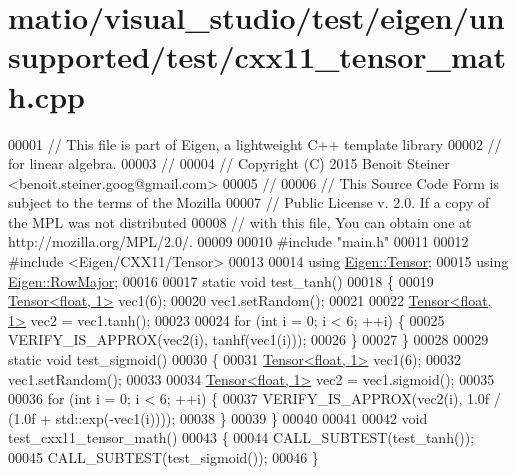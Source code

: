 \hypertarget{matio_2visual__studio_2test_2eigen_2unsupported_2test_2cxx11__tensor__math_8cpp_source}{}\section{matio/visual\+\_\+studio/test/eigen/unsupported/test/cxx11\+\_\+tensor\+\_\+math.cpp}
\label{matio_2visual__studio_2test_2eigen_2unsupported_2test_2cxx11__tensor__math_8cpp_source}

\begin{DoxyCode}
00001 \textcolor{comment}{// This file is part of Eigen, a lightweight C++ template library}
00002 \textcolor{comment}{// for linear algebra.}
00003 \textcolor{comment}{//}
00004 \textcolor{comment}{// Copyright (C) 2015 Benoit Steiner <benoit.steiner.goog@gmail.com>}
00005 \textcolor{comment}{//}
00006 \textcolor{comment}{// This Source Code Form is subject to the terms of the Mozilla}
00007 \textcolor{comment}{// Public License v. 2.0. If a copy of the MPL was not distributed}
00008 \textcolor{comment}{// with this file, You can obtain one at http://mozilla.org/MPL/2.0/.}
00009 
00010 \textcolor{preprocessor}{#include "main.h"}
00011 
00012 \textcolor{preprocessor}{#include <Eigen/CXX11/Tensor>}
00013 
00014 \textcolor{keyword}{using} \hyperlink{class_eigen_1_1_tensor}{Eigen::Tensor};
00015 \textcolor{keyword}{using} \hyperlink{group__enums_ggaacded1a18ae58b0f554751f6cdf9eb13acfcde9cd8677c5f7caf6bd603666aae3}{Eigen::RowMajor};
00016 
00017 \textcolor{keyword}{static} \textcolor{keywordtype}{void} test\_tanh()
00018 \{
00019   \hyperlink{class_eigen_1_1_tensor}{Tensor<float, 1>} vec1(6);
00020   vec1.setRandom();
00021 
00022   \hyperlink{class_eigen_1_1_tensor}{Tensor<float, 1>} vec2 = vec1.tanh();
00023 
00024   \textcolor{keywordflow}{for} (\textcolor{keywordtype}{int} i = 0; i < 6; ++i) \{
00025     VERIFY\_IS\_APPROX(vec2(i), tanhf(vec1(i)));
00026   \}
00027 \}
00028 
00029 \textcolor{keyword}{static} \textcolor{keywordtype}{void} test\_sigmoid()
00030 \{
00031   \hyperlink{class_eigen_1_1_tensor}{Tensor<float, 1>} vec1(6);
00032   vec1.setRandom();
00033 
00034   \hyperlink{class_eigen_1_1_tensor}{Tensor<float, 1>} vec2 = vec1.sigmoid();
00035 
00036   \textcolor{keywordflow}{for} (\textcolor{keywordtype}{int} i = 0; i < 6; ++i) \{
00037     VERIFY\_IS\_APPROX(vec2(i), 1.0f / (1.0f + std::exp(-vec1(i))));
00038   \}
00039 \}
00040 
00041 
00042 \textcolor{keywordtype}{void} test\_cxx11\_tensor\_math()
00043 \{
00044   CALL\_SUBTEST(test\_tanh());
00045   CALL\_SUBTEST(test\_sigmoid());
00046 \}
\end{DoxyCode}
